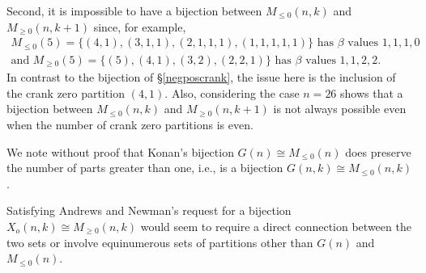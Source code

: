 \documentclass{amsart}
\theoremstyle{theorem}
\theoremstyle{definition}
\begin{document}
Second, it is impossible to have a bijection between $M_{\le 0}(n,k)$ and $M_{\ge 0}(n,k+1)$ since, for example, 
\begin{gather*}
M_{\le 0}(5) = \{ (4,1), (3,1,1), (2,1,1,1), (1,1,1,1,1) \}  \text{ has $\beta$ values $1,1,1,0$} \\
\text{and } M_{\ge 0}(5) = \{ (5), (4,1), (3,2), (2,2,1) \}  \text{ has $\beta$ values $1,1,2,2$.}
\end{gather*}
In contrast to the bijection of \S \ref{negposcrank}, the issue here is the inclusion of the crank zero partition $(4,1)$.  Also, considering the case $n=26$ shows that a bijection between $M_{\le 0}(n,k)$ and $M_{\ge 0}(n,k+1)$ is not always possible even when the number of crank zero partitions is even.

We note without proof that Konan's bijection $G(n) \cong M_{\le 0}(n)$ does preserve the number of parts greater than one, i.e., is a bijection $G(n,k) \cong M_{\le 0}(n,k)$.

Satisfying Andrews and Newman's request for a bijection $X_o(n,k) \cong M_{\ge 0}(n,k)$ would seem to require a direct connection between the two sets or involve equinumerous sets of partitions other than $G(n)$ and $M_{\le 0}(n)$.
\end{document}
